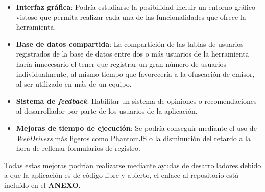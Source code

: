 \begin{itemize}
	\item \textbf{Interfaz gráfica}: Podría estudiarse la posibilidad incluir un entorno gráfico vistoso que permita realizar cada una de las funcionalidades que ofrece la herramienta.
	\item \textbf{Base de datos compartida}: La compartición de las tablas de usuarios registrados de la base de datos entre dos o más usuarios de la herramienta haría innecesario el tener que registrar un gran número de usuarios individualmente, al mismo tiempo que favorecería a la ofuscación de emisor, al ser utilizado en más de un equipo.
	\item \textbf{Sistema de \textit{feedback}}: Habilitar un sistema de opiniones o recomendaciones al desarrollador por parte de los usuarios de la aplicación.	
	\item \textbf{Mejoras de tiempo de ejecución}: Se podría conseguir mediante el uso de \textit{WebDrivers} más ligeros como PhantomJS o la disminución del retardo a la hora de rellenar formularios de registro.	
	
\end{itemize}


Todas estas mejoras podrían realizarse mediante ayudas de desarrolladores debido a que la aplicación es de código libre y abierto, el enlace al repositorio está incluído en el \textbf{ANEXO}.

\newpage \thispagestyle{empty} %